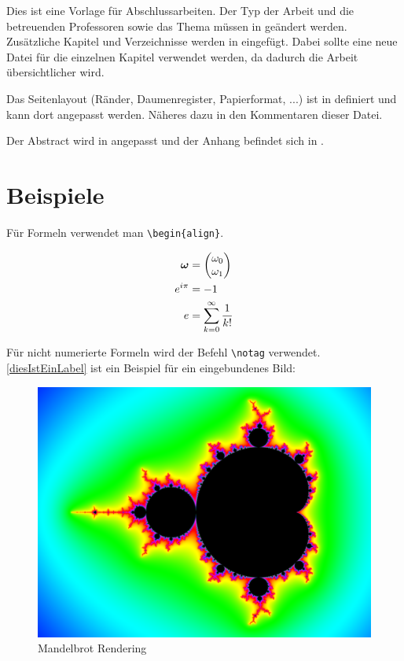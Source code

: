 
Dies ist eine Vorlage für Abschlussarbeiten. Der Typ der Arbeit und die betreuenden Professoren sowie das Thema müssen in  geändert werden. Zusätzliche Kapitel und Verzeichnisse werden in  eingefügt. Dabei sollte eine neue  Datei für die einzelnen Kapitel verwendet werden, da dadurch die Arbeit übersichtlicher wird.

Das Seitenlayout (Ränder, Daumenregister, Papierformat, ...) ist in  definiert und kann dort angepasst werden. Näheres dazu in den Kommentaren dieser Datei.

Der Abstract wird in  angepasst und der Anhang befindet sich in .

\section{Beispiele}

Für Formeln verwendet man \lstinline|\begin{align}|.

\begin{align}
	\boldsymbol{\omega} &= \begin{pmatrix} \omega_0 \\ \omega_1 \end{pmatrix} \notag \\
	e^{i \pi} &= -1 \\
	e &= \sum_{k=0}^{\infty}\frac{1}{k!}
\end{align}

Für nicht numerierte Formeln wird der Befehl \lstinline|\notag| verwendet.
\\
\autoref{diesIstEinLabel} ist ein Beispiel für ein eingebundenes Bild:

\begin{figure}[H] %
	\centering
	\includegraphics[width=.8\linewidth]{Bilder/mandelbrot}
	\caption{Mandelbrot Rendering}
	\label{diesIstEinLabel} %
\end{figure}

